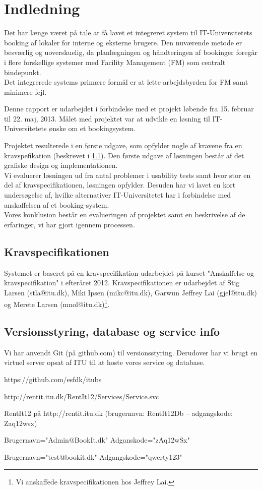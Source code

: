 \chapter{Indledning}
\label{Intro}
Det har længe været på tale at få lavet et integreret system til IT-Universitetets booking af lokaler for interne og eksterne brugere. Den nuværende metode er besværlig og uoverskuelig, da planlægningen og håndteringen af bookinger foregår i flere forskellige systemer med Facility Management (FM) som centralt bindepunkt\cite[Kap. A]{kravspec}.
\\Det integrerede systems primære formål er at lette arbejdsbyrden for FM samt minimere fejl. 

Denne rapport er udarbejdet i forbindelse med et projekt løbende fra 15. februar til 22. maj, 2013. Målet med projektet var at udvikle en løsning til IT-Universitetets ønske om et bookingsystem. 

Projektet resulterede i en første udgave, som opfylder nogle af kravene fra en kravspefikation (beskrevet i \ref{Intro_kravspec}). Den første udgave af løsningen består af det grafiske design og implementationen. 
\\Vi evaluerer løsningen ud fra antal problemer i usability tests samt hvor stor en del af kravspecifikationen, løsningen opfylder. Desuden har vi lavet en kort undersøgelse af, hvilke alternativer IT-Universitetet har i forbindelse med anskaffelsen af et booking-system.
\\Vores konklusion består en evalueringen af projektet samt en beskrivelse af de erfaringer, vi har gjort igennem processen.

\section{Kravspecifikationen}
\label{Intro_kravspec}
Systemet er baseret på en kravspecifikation udarbejdet på kurset "Anskaffelse og kravspecifikation" i efteråret 2012. Kravspecifikationen er udarbejdet af Stig Larsen (stla@itu.dk), Miki Ipsen (mikc@itu.dk), Garwun Jeffrey Lai (gjel@itu.dk) og Merete Larsen (mnol@itu.dk)\footnote{Vi anskaffede kravspecifikationen hos Jeffrey Lai.}. 

\section{Versionsstyring, database og service info}
\label{Intro_vs}
Vi har anvendt Git (på github.com) til versionsstyring. Derudover har vi brugt en virtuel server opsat af ITU til at hoste vores service og database.
\begin{my_description}
\item[GitHub repository] https://github.com/esfdk/itubs
\item[Service URL] http://rentit.itu.dk/RentIt12/Services/Service.svc
\item[Database] RentIt12 på http://rentit.itu.dk (brugernavn: RentIt12Db -- adgangskode: Zaq12wsx)
\item[Test Administrator] Brugernavn="Admin@BookIt.dk" Adganskode="zAq12wSx"
\item[Test Bruger] Brugernavn="test@bookit.dk" Adgangskode="qwerty123"
\end{my_description}